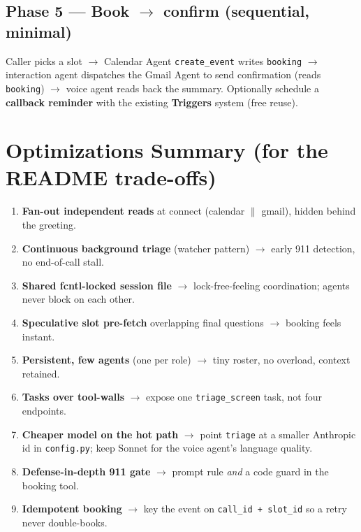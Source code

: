 \documentclass[11pt,a4paper]{article}
\begin{document}
\subsection{Phase 5 --- Book $\rightarrow$ confirm (sequential, minimal)}
Caller picks a slot $\rightarrow$ Calendar Agent \texttt{create\_event} writes \texttt{booking} $\rightarrow$
interaction agent dispatches the Gmail Agent to send confirmation (reads \texttt{booking}) $\rightarrow$ voice
agent reads back the summary. Optionally schedule a \textbf{callback reminder} with the existing \textbf{Triggers}
system (free reuse).

\section{Optimizations Summary (for the README trade-offs)}

\begin{enumerate}[leftmargin=*]
  \item \textbf{Fan-out independent reads} at connect (calendar $\parallel$ gmail), hidden behind the greeting.
  \item \textbf{Continuous background triage} (watcher pattern) $\rightarrow$ early 911 detection, no
  end-of-call stall.
  \item \textbf{Shared fcntl-locked session file} $\rightarrow$ lock-free-feeling coordination; agents never
  block on each other.
  \item \textbf{Speculative slot pre-fetch} overlapping final questions $\rightarrow$ booking feels instant.
  \item \textbf{Persistent, few agents} (one per role) $\rightarrow$ tiny roster, no overload, context retained.
  \item \textbf{Tasks over tool-walls} $\rightarrow$ expose one \texttt{triage\_screen} task, not four endpoints.
  \item \textbf{Cheaper model on the hot path} $\rightarrow$ point \texttt{triage} at a smaller Anthropic id in
  \texttt{config.py}; keep Sonnet for the voice agent's language quality.
  \item \textbf{Defense-in-depth 911 gate} $\rightarrow$ prompt rule \emph{and} a code guard in the booking tool.
  \item \textbf{Idempotent booking} $\rightarrow$ key the event on \texttt{call\_id + slot\_id} so a retry never
  double-books.
\end{enumerate}
\end{document}
